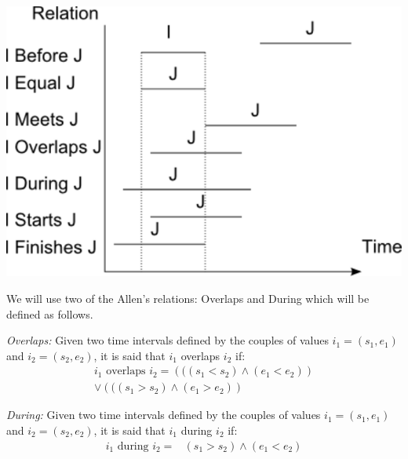 \begin{samepage}
\vspace*{13pt}
\begin{center}
{
\includegraphics[scale=0.5]{./graphs/allen.pdf}

}
\end{center}
\vspace*{10pt}
\vspace*{13pt}
\end{samepage}

We will use two of the Allen's relations: Overlaps and During which will be defined as follows.

\begin{definition}
\emph{Overlaps:}
 \label{def:overlaps}
Given two time intervals defined by the couples of values $i_1 = \left(s_1, e_1 \right)$ and $i_2 = \left(s_2, e_2\right)$, it is said that $i_1$ overlaps $i_2$ if:
\begin{align}
 \label{eqn:overlaps}
i_1 \text{ overlaps } i_2  = \left((\left(s_1 < s_2  \right) \wedge \left(e_1 < e_2  \right)\right)\\
\nonumber
\vee \left((\left(s_1 > s_2  \right) \wedge \left(e_1 > e_2  \right)\right)
\end{align}


\end{definition}
  

\begin{definition}
\emph{During:}
 \label{def:during}
Given two time intervals defined by the couples of values $i_1 = \left(s_1, e_1 \right)$ and $i_2 = \left(s_2, e_2\right)$, it is said that $i_1$ during $i_2$ if:
\begin{align}
 \label{eqn:during}
i_1\text{ during } i_2  =& \left(s_1 > s_2  \right) \wedge \left(e_1 < e_2 \right)
\end{align}
\end{definition}

